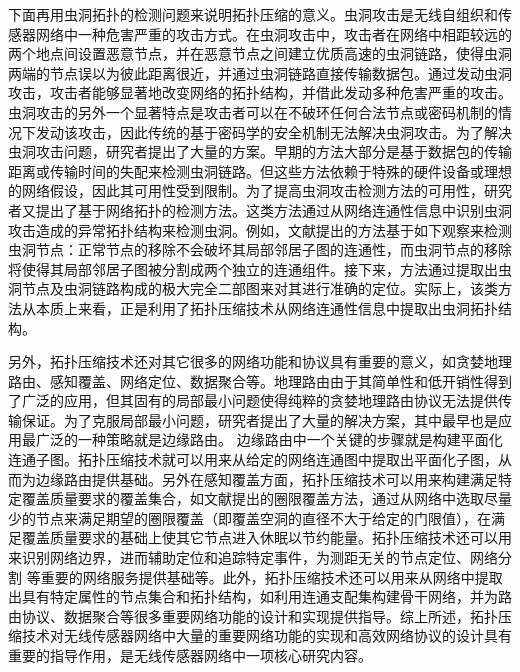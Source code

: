 下面再用虫洞拓扑的检测问题来说明拓扑压缩的意义。虫洞攻击是无线自组织和传感器网络中一种危害严重的攻击方式。在虫洞攻击中，攻击者在网络中相距较远的两个地点间设置恶意节点，并在恶意节点之间建立优质高速的虫洞链路，使得虫洞两端的节点误以为彼此距离很近，并通过虫洞链路直接传输数据包。通过发动虫洞攻击，攻击者能够显著地改变网络的拓扑结构，并借此发动多种危害严重的攻击。虫洞攻击的另外一个显著特点是攻击者可以在不破环任何合法节点或密码机制的情况下发动该攻击，因此传统的基于密码学的安全机制无法解决虫洞攻击。为了解决虫洞攻击问题，研究者提出了大量的方案。早期的方法大部分是基于数据包的传输距离或传输时间的失配来检测虫洞链路。但这些方法依赖于特殊的硬件设备或理想的网络假设，因此其可用性受到限制。为了提高虫洞攻击检测方法的可用性，研究者又提出了基于网络拓扑的检测方法。这类方法通过从网络连通性信息中识别虫洞攻击造成的异常拓扑结构来检测虫洞。例如，文献提出的方法基于如下观察来检测虫洞节点：正常节点的移除不会破坏其局部邻居子图的连通性，而虫洞节点的移除将使得其局部邻居子图被分割成两个独立的连通组件。接下来，方法通过提取出虫洞节点及虫洞链路构成的极大完全二部图来对其进行准确的定位。实际上，该类方法从本质上来看，正是利用了拓扑压缩技术从网络连通性信息中提取出虫洞拓扑结构。

另外，拓扑压缩技术还对其它很多的网络功能和协议具有重要的意义，如贪婪地理路由、感知覆盖、网络定位、数据聚合等。地理路由由于其简单性和低开销性得到了广泛的应用，但其固有的局部最小问题使得纯粹的贪婪地理路由协议无法提供传输保证。为了克服局部最小问题，研究者提出了大量的解决方案，其中最早也是应用最广泛的一种策略就是边缘路由。 边缘路由中一个关键的步骤就是构建平面化连通子图。拓扑压缩技术就可以用来从给定的网络连通图中提取出平面化子图，从而为边缘路由提供基础。另外在感知覆盖方面，拓扑压缩技术可以用来构建满足特定覆盖质量要求的覆盖集合，如文献提出的圈限覆盖方法，通过从网络中选取尽量少的节点来满足期望的圈限覆盖（即覆盖空洞的直径不大于给定的门限值），在满足覆盖质量要求的基础上使其它节点进入休眠以节约能量。拓扑压缩技术还可以用来识别网络边界，进而辅助定位和追踪特定事件，为测距无关的节点定位、网络分割 等重要的网络服务提供基础等。此外，拓扑压缩技术还可以用来从网络中提取出具有特定属性的节点集合和拓扑结构，如利用连通支配集构建骨干网络，并为路由协议、数据聚合等很多重要网络功能的设计和实现提供指导。综上所述，拓扑压缩技术对无线传感器网络中大量的重要网络功能的实现和高效网络协议的设计具有重要的指导作用，是无线传感器网络中一项核心研究内容。

